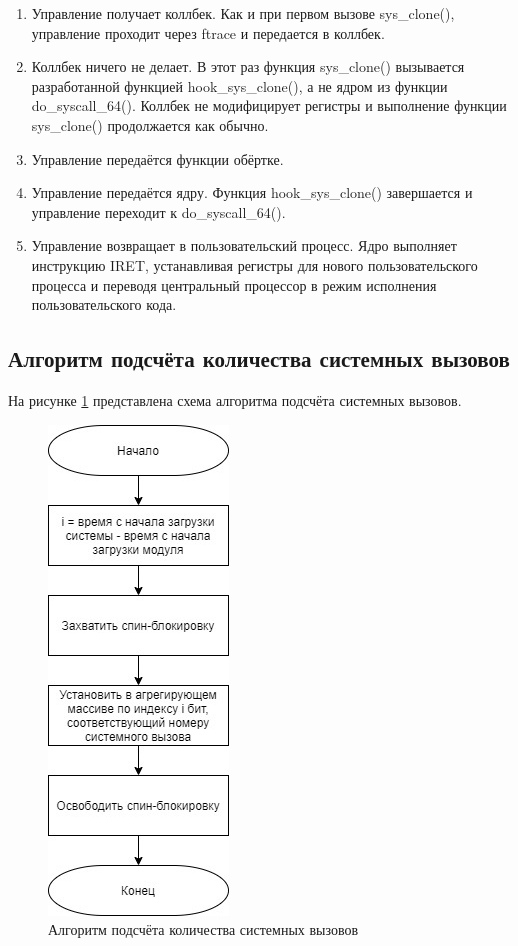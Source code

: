 \begin{enumerate}
	\item Управление получает коллбек. Как и при первом вызове sys\_clone(), управление проходит через ftrace и передается в коллбек.
	
	\item Коллбек ничего не делает. В этот раз функция sys\_clone() вызывается разработанной функцией hook\_sys\_clone(), а не ядром из функции\\ do\_syscall\_64(). Коллбек не модифицирует регистры и выполнение функции sys\_clone() продолжается как обычно.
	
	\item Управление передаётся функции обёртке.
	
	\item Управление передаётся ядру. Функция hook\_sys\_clone() завершается и управление переходит к do\_syscall\_64().
	
	\item Управление возвращает в пользовательский процесс. Ядро выполняет инструкцию IRET, устанавливая регистры для нового пользовательского процесса и переводя центральный процессор в режим исполнения пользовательского кода.
\end{enumerate}

\subsection{Алгоритм подсчёта количества системных вызовов}

На рисунке \ref{fig:ftrace_cnt_algo} представлена схема алгоритма подсчёта системных вызовов.

\begin{figure}[h]
	\begin{center}
		\includegraphics[scale=0.6]{jpg/syscalls_count.jpg}
	\end{center}
	\caption{Алгоритм подсчёта количества системных вызовов}
	\label{fig:ftrace_cnt_algo}
\end{figure}

